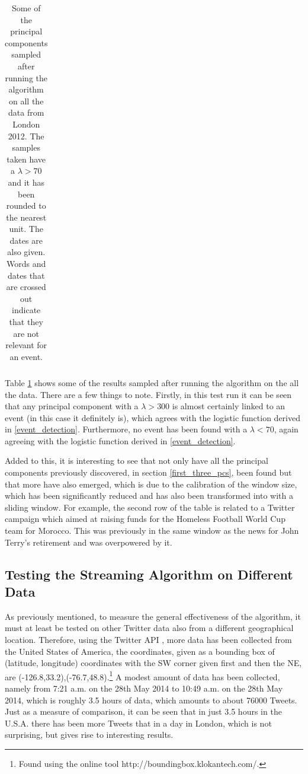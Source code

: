 \documentclass[11pt,a4paper]{article}
\begin{document}
\begin{table}[H]
\begin{tabular}{| l| r | l|}
\hline
\end{tabular}
\caption{Some of the principal components sampled after running the algorithm on all the data from London 2012. The samples taken have a $\lambda > 70$ and it has been rounded to the nearest unit. The dates are also given. Words and dates that are crossed out indicate that they are not relevant for an event.}
\label{streaming_test}
\end{table}

Table \ref{streaming_test} shows some of the results sampled after running the algorithm on the all the data. There are a few things to note. Firstly, in this test run it can be seen that any principal component with a $\lambda > 300$ is almost certainly linked to an event (in this case it definitely is), which agrees with the logistic function derived in \ref{event_detection}. Furthermore, no event has been found with a $\lambda < 70$, again agreeing with the logistic function derived in \ref{event_detection}. 

Added to this, it is interesting to see that not only have all the principal components previously discovered, in section \ref{first_three_pcs}, been found but that more have also emerged, which is due to the calibration of the window size, which has been significantly reduced and has also been transformed into with a sliding window. For example, the second row of the table is related to a Twitter campaign which aimed at raising funds for the Homeless Football World Cup team for Morocco. This was previously in the same window as the news for John Terry's retirement and was overpowered by it.

\subsection{Testing the Streaming Algorithm on Different Data}
As previously mentioned, to measure the general effectiveness of the algorithm, it must at least be tested on other Twitter data also from a different geographical location. Therefore, using the Twitter API \cite{twitter_api}, more data has been collected from the United States of America, the coordinates, given as a bounding box of (latitude, longitude) coordinates with the SW corner given first and then the NE, are (-126.8,33.2),(-76.7,48.8).\footnote{Found using the online tool http://boundingbox.klokantech.com/.} A modest amount of data has been collected, namely from 7:21 a.m. on the 28th May 2014 to 10:49 a.m. on the 28th May 2014, which is roughly 3.5 hours of data, which amounts to about 76000 Tweets. Just as a measure of comparison, it can be seen that in just 3.5 hours in the U.S.A. there has been more Tweets that in a day in London, which is not surprising, but gives rise to interesting results. 
\end{document}

